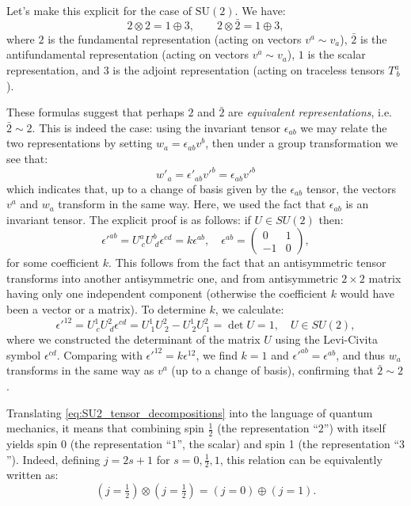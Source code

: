 \begin{example}
    Let's make this explicit for the case of \(\mathrm{SU}(2)\). We have:
    \begin{equation}
        2 \otimes 2 = 1 \oplus 3, \qquad 2 \otimes \bar{2} = 1 \oplus 3,
        \label{eq:SU2_tensor_decompositions}
    \end{equation}
    where \(2\) is the fundamental representation (acting on vectors \(v^a \sim v_{\dot{a}}\)), \(\bar{2}\) is the antifundamental representation (acting on vectors \(v^{\dot{a}} \sim v_a\)), \(1\) is the scalar representation, and \(3\) is the adjoint representation (acting on traceless tensors \(T^a_{\ b}\)).

    These formulas suggest that perhaps \(2\) and \(\bar{2}\) are \textit{equivalent representations}, i.e. \(\bar{2} \sim 2\). This is indeed the case: using the invariant tensor \(\epsilon_{ab}\) we may relate the two representations by setting \(w_a = \epsilon_{ab} v^b\), then under a group transformation we see that:
    \[
        w'_a = \epsilon'_{ab} v'^b = \epsilon_{ab} v'^b
    \]
    which indicates that, up to a change of basis given by the \(\epsilon_{ab}\) tensor, the vectors \(v^a\) and \(w_a\) transform in the same way. Here, we used the fact that \(\epsilon_{ab}\) is an invariant tensor. The explicit proof is as follows: if \(U \in SU(2)\) then:
    \[
        \epsilon'^{ab} = U^a_{\ c} U^b_{\ d} \epsilon^{cd} = k \epsilon^{ab}, \quad \epsilon^{ab} = \begin{pmatrix} 0 & 1 \\ -1 & 0 \end{pmatrix},
    \]
    for some coefficient \(k\). This follows from the fact that an antisymmetric tensor transforms into another antisymmetric one, and from antisymmetric \(2 \times 2\) matrix having only one independent component (otherwise the coefficient \(k\) would have been a vector or a matrix). To determine \(k\), we calculate:
    \[
        \epsilon'^{12} = U^1_{\ c} U^2_{\ d} \epsilon^{cd} = U^1_{\ 1} U^2_{\ 2} - U^1_{\ 2} U^2_{\ 1} = \det U = 1, \quad U \in SU(2),
    \]
    where we constructed the determinant of the matrix \(U\) using the Levi-Civita symbol \(\epsilon^{cd}\). Comparing with \(\epsilon'^{12} = k \epsilon^{12}\), we find \(k = 1\) and \(\epsilon'^{ab} = \epsilon^{ab}\), and thus \(w_a\) transforms in the same way as \(v^a\) (up to a change of basis), confirming that \(\bar{2} \sim 2\).

    Translating \eqref{eq:SU2_tensor_decompositions} into the language of quantum mechanics, it means that combining spin \(\frac{1}{2}\) (the representation ``\(2\)'') with itself yields spin 0 (the representation ``\(1\)'', the scalar) and spin 1 (the representation ``\(3\)''). Indeed, defining \(j = 2s + 1\) for \(s = 0, \frac{1}{2}, 1\), this relation can be equivalently written as:
    \[
        (j = \tfrac{1}{2}) \otimes (j = \tfrac{1}{2}) = (j = 0) \oplus (j = 1).
    \]


\end{example}

